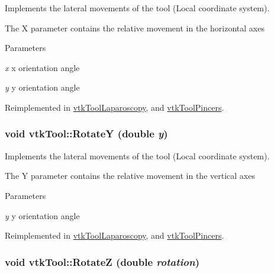 Implements the lateral movements of the tool (Local coordinate system). 

The X parameter contains the relative movement in the horizontal axes 
\begin{DoxyParams}{Parameters}
\item[{\em x}]x orientation angle \item[{\em y}]y orientation angle \end{DoxyParams}


Reimplemented in \hyperlink{classvtkToolLaparoscopy_a6894dddee203102828358697e8214974}{vtkToolLaparoscopy}, and \hyperlink{classvtkToolPincers_ac6b80a0c7a43ae67cfafbe29772b41d0}{vtkToolPincers}.

\hypertarget{classvtkTool_ad37e6208805e0fddd07dfc783a70fceb}{
\subsubsection[{RotateY}]{\setlength{\rightskip}{0pt plus 5cm}void vtkTool::RotateY (double {\em y})}}
\label{classvtkTool_ad37e6208805e0fddd07dfc783a70fceb}


Implements the lateral movements of the tool (Local coordinate system). 

The Y parameter contains the relative movement in the vertical axes 
\begin{DoxyParams}{Parameters}
\item[{\em y}]y orientation angle \end{DoxyParams}


Reimplemented in \hyperlink{classvtkToolLaparoscopy_ae0245eaa9aa765a675da5135c4af422a}{vtkToolLaparoscopy}, and \hyperlink{classvtkToolPincers_aa2a15405aa65c96dd971e3c06d98d197}{vtkToolPincers}.

\hypertarget{classvtkTool_a80c0ca1937ce97c98d70364cac281ff2}{
\subsubsection[{RotateZ}]{\setlength{\rightskip}{0pt plus 5cm}void vtkTool::RotateZ (double {\em rotation})}}
\label{classvtkTool_a80c0ca1937ce97c98d70364cac281ff2}


